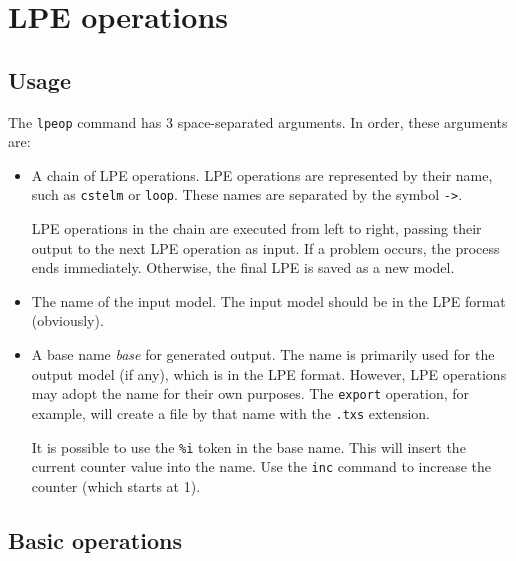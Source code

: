 \chapter{LPE operations}

\section{Usage}

The \texttt{lpeop} command has 3 space-separated arguments. In order, these arguments are:

\begin{itemize}
\item A chain of LPE operations.
LPE operations are represented by their name, such as \texttt{cstelm} or \texttt{loop}.
These names are separated by the symbol \texttt{->}.

LPE operations in the chain are executed from left to right, passing their output to the next LPE operation as input.
If a problem occurs, the process ends immediately.
Otherwise, the final LPE is saved as a new model.
\item The name of the input model.
The input model should be in the LPE format (obviously).
\item A base name \textit{base} for generated output.
The name is primarily used for the output model (if any), which is in the LPE format.
However, LPE operations may adopt the name for their own purposes.
The \texttt{export} operation, for example, will create a file by that name with the \texttt{.txs} extension.

It is possible to use the \texttt{\%i} token in the base name.
This will insert the current counter value into the name.
Use the \texttt{inc} command to increase the counter (which starts at 1).
\end{itemize}

\section{Basic operations}


